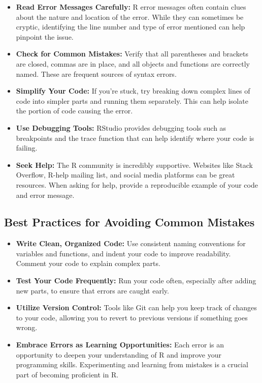 \documentclass[
]{book}
\begin{document}
\begin{itemize}
\item
  \textbf{Read Error Messages Carefully:} R error messages often contain clues about the nature and location of the error. While they can sometimes be cryptic, identifying the line number and type of error mentioned can help pinpoint the issue.
\item
  \textbf{Check for Common Mistakes:} Verify that all parentheses and brackets are closed, commas are in place, and all objects and functions are correctly named. These are frequent sources of syntax errors.
\item
  \textbf{Simplify Your Code:} If you're stuck, try breaking down complex lines of code into simpler parts and running them separately. This can help isolate the portion of code causing the error.
\item
  \textbf{Use Debugging Tools:} RStudio provides debugging tools such as breakpoints and the trace function that can help identify where your code is failing.
\item
  \textbf{Seek Help:} The R community is incredibly supportive. Websites like Stack Overflow, R-help mailing list, and social media platforms can be great resources. When asking for help, provide a reproducible example of your code and error message.
\end{itemize}

\subsection*{Best Practices for Avoiding Common Mistakes}\label{best-practices-for-avoiding-common-mistakes}

\begin{itemize}
\item
  \textbf{Write Clean, Organized Code:} Use consistent naming conventions for variables and functions, and indent your code to improve readability. Comment your code to explain complex parts.
\item
  \textbf{Test Your Code Frequently:} Run your code often, especially after adding new parts, to ensure that errors are caught early.
\item
  \textbf{Utilize Version Control:} Tools like Git can help you keep track of changes to your code, allowing you to revert to previous versions if something goes wrong.
\item
  \textbf{Embrace Errors as Learning Opportunities:} Each error is an opportunity to deepen your understanding of R and improve your programming skills. Experimenting and learning from mistakes is a crucial part of becoming proficient in R.
\end{itemize}
\end{document}
